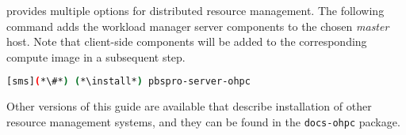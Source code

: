 \OHPC{} provides multiple options for distributed resource management. The 
following command adds the \rms{} workload manager server components to the
chosen {\em master} host. Note that client-side components will be added to
the corresponding compute image in a subsequent step.

\begin{lstlisting}[language=bash,keywords={}]
[sms](*\#*) (*\install*) pbspro-server-ohpc
\end{lstlisting}

Other versions of this guide are available that describe installation of other
resource management systems, and they can be found in the \texttt{docs-ohpc}
package.
